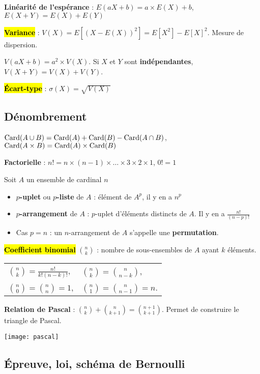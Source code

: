 \documentclass[10pt,fleqn, openany, landscape, twocolumn]{book} %
\begin{document}
\textbf{Linéarité de l'espérance} : $E(aX+b)=a \times E(X)+b$, $E(X+Y)=E(X)+E(Y)$

\hl{\textbf{Variance}} : $V(X)=E[(X-E(X))^2]=E[X^2]-E[X]^2$. Mesure de dispersion.

$V(aX+b)=a^2 \times V(X)$. Si $X$ et $Y$ sont \textbf{indépendantes}, $V(X+Y)=V(X)+V(Y)$.

\hl{\textbf{Écart-type}} : $\sigma(X)=\sqrt{V(X)}$

\subsection*{Dénombrement}

$\mathrm{Card}(A\cup B)= \mathrm{Card}(A) + \mathrm{Card}(B) - \mathrm{Card}(A \cap B)$, $\mathrm{Card}(A \times B)= \mathrm{Card}(A) \times \mathrm{Card}(B)$

\textbf{Factorielle} : $n! = n \times (n-1) \times \dots \times 3 \times 2 \times 1$, $0!=1$

Soit $A$ un ensemble de cardinal $n$
\begin{itemize}
\item \textbf{$p$-uplet} ou \textbf{$p$-liste} de $A$ : élément de $A^p$, il y en a $n^p$
\item \textbf{$p$-arrangement} de $A$ : $p$-uplet d'éléments distincts de $A$. Il y en a $\frac{n!}{(n-p)!}$
\item Cas $p=n$ : un $n$-arrangement de $A$ s'appelle une \textbf{permutation}.
\end{itemize}

\hl{\textbf{Coefficient binomial }}$\binom{n}{k}$ :  nombre de sous-ensembles de $A$ ayant $k$ éléments.

\begin{minipage}{0.5\linewidth}

\begin{tabularx}{\linewidth}{XX}
$\binom{n}{k}=\frac{n!}{k!(n-k)!}$, & $\binom{n}{k} = \binom{n}{n-k}$, \\ $\binom{n}{0}=\binom{n}{n} = 1$, & $\binom{n}{1}=\binom{n}{n-1}=n$.\end{tabularx}

\textbf{Relation de Pascal} : $\binom{n}{k} + \binom{n}{k+1} = \binom{n+1}{k+1}$. Permet de construire le triangle de Pascal.
\end{minipage}\hfill\begin{minipage}{0.45\linewidth}
\texttt{[image: pascal]}\end{minipage}

\subsection*{Épreuve, loi, schéma de Bernoulli}
\end{document}
